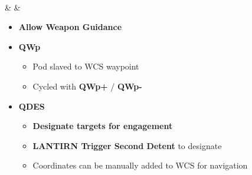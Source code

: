 \documentclass[fontInter]{TechCheck}
\begin{document}
\begin{listlongtable}
\begin{minipage}[t]{\linewidth}
\begin{itemize}
\begin{itemize}
				\end{itemize}
			\end{itemize}
		\end{minipage} \\
		\midrule
		\textbf{\textbullet} &  &
		\begin{minipage}[t]{\linewidth}
			\vspace{-7pt}
			\begin{itemize}
				\item \textbf{Allow Weapon Guidance}
				\item \textbf{QWp}
				\begin{itemize}
					\item Pod slaved to WCS waypoint
					\item Cycled with \textbf{QWp+} / \textbf{QWp-}
				\end{itemize}
				\item \textbf{QDES}
				\begin{itemize}
					\item \textbf{Designate targets for engagement}
					\item \textbf{LANTIRN Trigger Second Detent} to designate
					\item Coordinates can be manually added to WCS for navigation
				\end{itemize}
			\end{itemize}
		\end{minipage} \\
	\end{listlongtable}

	\clearpage

	\hypertarget{subsec:lantirnlasingdesignation}{}
\end{document}
